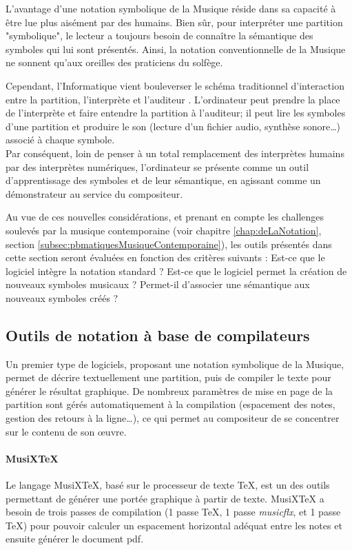 L'avantage d'une notation symbolique de la Musique réside dans sa capacité à être lue plus aisément par des humains. Bien sûr, pour interpréter une partition "symbolique", le lecteur a toujours besoin de connaître la sémantique des symboles qui lui sont présentés. Ainsi, la notation conventionnelle de la Musique ne sonnent qu'aux oreilles des praticiens du solfège.

Cependant, l'Informatique vient bouleverser le schéma traditionnel d'interaction entre la partition, l'interprète et l'auditeur \cite{gottfried2017}. L'ordinateur peut prendre la place de l'interprète et faire entendre la partition à l'auditeur; il peut lire les symboles d'une partition et produire le son (lecture d'un fichier audio, synthèse sonore…) associé à chaque symbole. \\
Par conséquent, loin de penser à un total remplacement des interprètes humains par des interprètes numériques, l'ordinateur se présente comme un outil d'apprentissage des symboles et de leur sémantique, en agissant comme un démonstrateur au service du compositeur.  

Au vue de ces nouvelles considérations, et prenant en compte les challenges soulevés par la musique contemporaine (voir chapitre \ref{chap:deLaNotation}, section \ref{subsec:pbmatiquesMusiqueContemporaine}), les outils présentés dans cette section seront évaluées en fonction des critères suivants :
Est-ce que le logiciel intègre la notation standard ? Est-ce que le logiciel permet la création de nouveaux symboles musicaux ? Permet-il d'associer une sémantique aux nouveaux symboles créés ?

\subsection{Outils de notation à base de compilateurs}
\label{subsec:notationABaseCompilateurs}
Un premier type de logiciels, proposant une notation symbolique de la Musique, permet de décrire textuellement une partition, puis de compiler le texte pour générer le résultat graphique.
De nombreux paramètres de mise en page de la partition sont gérés automatiquement à la compilation (espacement des notes, gestion des retours à la ligne…), ce qui permet au compositeur de se concentrer sur le contenu de son œuvre.

\paragraph{MusiXTeX} Le langage MusiXTeX, basé sur le processeur de texte \TeX, est un des outils permettant de générer une portée graphique à partir de texte. MusiXTeX a besoin de trois passes de compilation (1 passe \TeX, 1 passe \textit{musicflx}, et 1 passe \TeX) pour pouvoir calculer un espacement horizontal adéquat entre les notes et ensuite générer le document pdf.

